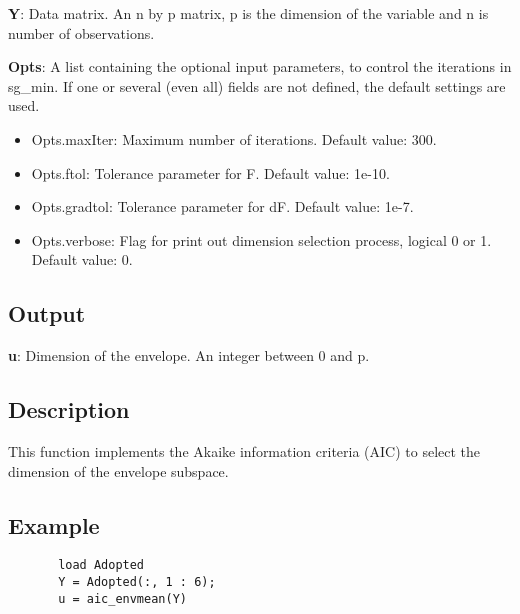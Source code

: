 \documentclass[a4paper,11pt,openany]{memoir}
\begin{document}
\begin{par}
\textbf{Y}: Data matrix. An n by p matrix, p is the dimension of the variable and n is number of observations.
\end{par} \vspace{1em}
\begin{par}
\textbf{Opts}: A list containing the optional input parameters, to control the iterations in sg\_min. If one or several (even all) fields are not defined, the default settings are used.
\end{par} \vspace{1em}
\begin{itemize}
\setlength{\itemsep}{-1ex}
   \item Opts.maxIter: Maximum number of iterations.  Default value: 300.
   \item Opts.ftol: Tolerance parameter for F.  Default value: 1e-10.
   \item Opts.gradtol: Tolerance parameter for dF.  Default value: 1e-7.
   \item Opts.verbose: Flag for print out dimension selection process, logical 0 or 1. Default value: 0.
\end{itemize}


\subsection*{Output}

\begin{par}
\textbf{u}: Dimension of the envelope. An integer between 0 and p.
\end{par} \vspace{1em}


\subsection*{Description}

\begin{par}
This function implements the Akaike information criteria (AIC) to select the dimension of the envelope subspace.
\end{par} \vspace{1em}


\subsection*{Example}


\begin{verbatim}       load Adopted
       Y = Adopted(:, 1 : 6);
       u = aic_envmean(Y)\end{verbatim}
    
\end{document}
